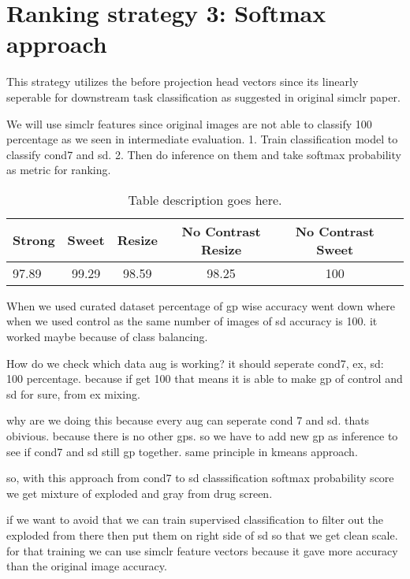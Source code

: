 \section{Ranking strategy 3: Softmax approach}

This strategy utilizes the before projection head vectors since its linearly seperable for downstream task classification as suggested in original simclr paper.

We will use simclr features since original images are not able to classify 100 percentage as we seen in intermediate evaluation.
1. Train classification model to classify cond7 and sd. 
2. Then do inference on them and take softmax probability as metric for ranking.

\begin{table}[H]
  \centering
  \begin{tabular}{@{}lccccc@{}}
  \toprule
  \textbf{Strong} & \textbf{Sweet} & \textbf{Resize} & \textbf{No Contrast Resize} & \textbf{No Contrast Sweet} \\ \midrule
  97.89           & 99.29          & 98.59           & 98.25                       & 100                        \\ \bottomrule
  \end{tabular}
  \caption{Table description goes here.}
  \label{tab:ranking softmax}
  \end{table}
  

When we used curated dataset percentage of gp wise accuracy went down where when we used control as the same number of images of sd accuracy is 100. 
it worked maybe because of class balancing.

How do we check which data aug is working?
it should seperate cond7, ex, sd: 100 percentage. because if get 100 that means it is able to make gp of control and sd for sure, from ex mixing.

why are we doing this because every aug can  seperate cond 7 and sd. thats obivious. because there is no other gps. so we have to add new gp as inference to see if 
cond7 and sd still gp together. same principle in kmeans approach.

so, with this approach from cond7 to sd classsification softmax probability score we get mixture of exploded and gray from drug screen.

if we want to avoid that we can train supervised classification to filter out the exploded from there then put them on right side of sd so that we get clean scale.
for that training we can use simclr feature vectors because it gave more accuracy than the original image accuracy.

